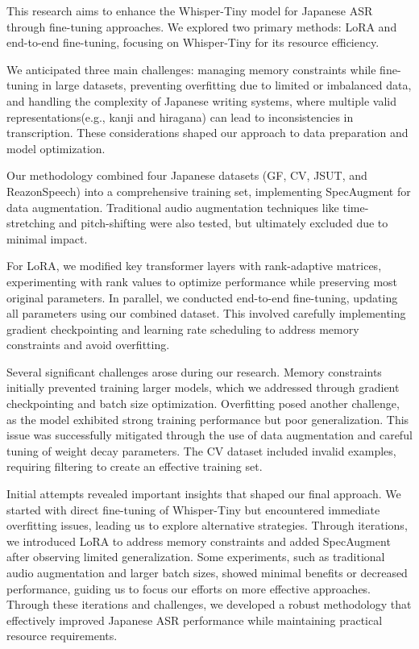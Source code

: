 \documentclass[10pt,twocolumn,letterpaper]{article}
\begin{document}
This research aims to enhance the Whisper-Tiny model for Japanese ASR through fine-tuning approaches. We explored two primary methods: LoRA \cite{hu2021loralowrankadaptationlarge,xu2023parameterefficientfinetuningmethodspretrained} and end-to-end fine-tuning, focusing on Whisper-Tiny for its resource efficiency.

We anticipated three main challenges: managing memory constraints while fine-tuning in large datasets, preventing overfitting due to limited or imbalanced data, and handling the complexity of Japanese writing systems, where multiple valid representations(e.g., kanji and hiragana) can lead to inconsistencies in transcription. These considerations shaped our approach to data preparation and model optimization.

Our methodology combined four Japanese datasets (GF, CV, JSUT, and ReazonSpeech) into a comprehensive training set, implementing SpecAugment for data augmentation. Traditional audio augmentation techniques like time-stretching and pitch-shifting were also tested, but ultimately excluded due to minimal impact.

For LoRA, we modified key transformer layers with rank-adaptive matrices, experimenting with rank values to optimize performance while preserving most original parameters. In parallel, we conducted end-to-end fine-tuning, updating all parameters using our combined dataset. This involved carefully implementing gradient checkpointing and learning rate scheduling to address memory constraints and avoid overfitting.

Several significant challenges arose during our research. Memory constraints initially prevented training larger models, which we addressed through gradient checkpointing and batch size optimization. Overfitting posed another challenge, as the model exhibited strong training performance but poor generalization. This issue was successfully mitigated through the use of data augmentation and careful tuning of weight decay parameters. The CV dataset included invalid examples, requiring filtering to create an effective training set.

Initial attempts revealed important insights that shaped our final approach. We started with direct fine-tuning of Whisper-Tiny but encountered immediate overfitting issues, leading us to explore alternative strategies. Through iterations, we introduced LoRA to address memory constraints and added SpecAugment after observing limited generalization. Some experiments, such as traditional audio augmentation and larger batch sizes, showed minimal benefits or decreased performance, guiding us to focus our efforts on more effective approaches. Through these iterations and challenges, we developed a robust methodology that effectively improved Japanese ASR performance while maintaining practical resource requirements.
\end{document}
